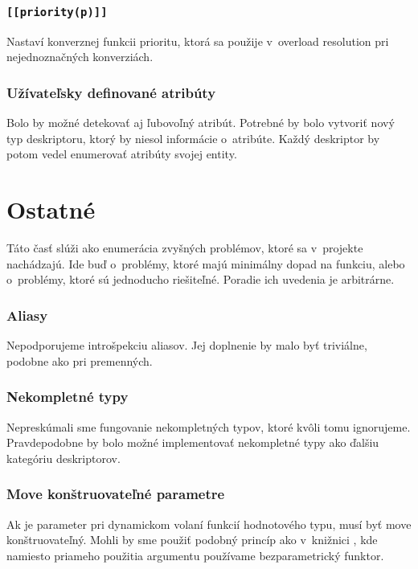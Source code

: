 \subsubsection{\texttt{[[priority(p)]]}}

Nastaví konverznej funkcii prioritu, ktorá sa použije v~overload resolution pri nejednoznačných konverziách.

\subsubsection{Užívateľsky definované atribúty}

Bolo by možné detekovať aj ľubovoľný atribút. Potrebné by bolo vytvoriť nový typ deskriptoru, ktorý by niesol informácie o~atribúte. Každý deskriptor by potom vedel enumerovať atribúty svojej entity.

\section{Ostatné}

Táto časť slúži ako enumerácia zvyšných problémov, ktoré sa v~projekte nachádzajú. Ide buď o~problémy, ktoré majú minimálny dopad na funkciu, alebo o~problémy, ktoré sú jednoducho riešiteľné. Poradie ich uvedenia je arbitrárne.

\subsubsection{Aliasy}

Nepodporujeme introšpekciu aliasov. Jej doplnenie by malo byť triviálne, podobne ako pri premenných.

\subsubsection{Nekompletné typy}

Nepreskúmali sme fungovanie nekompletných typov, ktoré kvôli tomu ignorujeme. Pravdepodobne by bolo možné implementovať nekompletné typy ako ďalšiu kategóriu deskriptorov.

\subsubsection{Move konštruovateľné parametre}

Ak je parameter pri dynamickom volaní funkcií hodnotového typu, musí byť move konštruovateľný. Mohli by sme použiť podobný princíp ako v~knižnici \PP{}, kde namiesto priameho použitia argumentu používame bezparametrický funktor.

